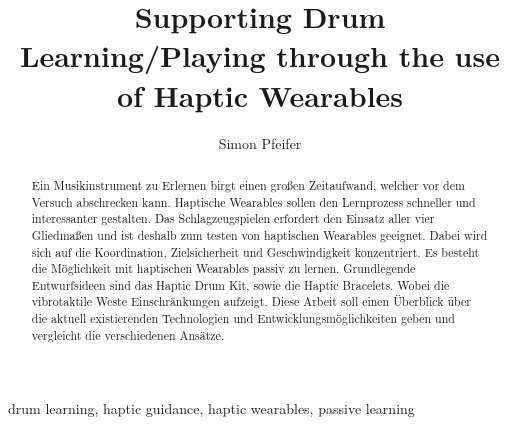 \documentclass[ngerman,runningheads,a4paper]{llncs}
\begin{document}
\title{Supporting Drum Learning/Playing through the use of Haptic Wearables}
\author{Simon Pfeifer}
\maketitle

\begin{abstract}
Ein Musikinstrument zu Erlernen birgt einen großen Zeitaufwand, welcher vor dem Versuch abschrecken kann.
Haptische Wearables sollen den Lernprozess schneller und interessanter gestalten.
Das Schlagzeugspielen erfordert den Einsatz aller vier Gliedmaßen und ist deshalb zum testen von haptischen Wearables geeignet.
Dabei wird sich auf die Koordination, Zielsicherheit und Geschwindigkeit konzentriert.
Es besteht die Möglichkeit mit haptischen Wearables passiv zu lernen.
Grundlegende Entwurfsideen sind das Haptic Drum Kit, sowie die Haptic Bracelets.
Wobei die vibrotaktile Weste Einschränkungen aufzeigt.
Diese Arbeit soll einen Überblick über die aktuell existierenden Technologien und Entwicklungsmöglichkeiten geben und vergleicht die verschiedenen Ansätze.
\end{abstract}

\begin{keywords}
drum learning, haptic guidance, haptic wearables, passive learning
\end{keywords}
\end{document}
